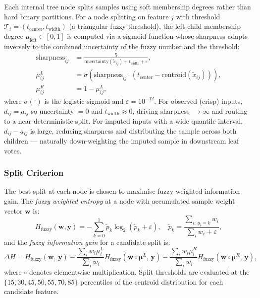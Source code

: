 \documentclass[a4paper,fleqn,longmktitle]{cas-sc}
\begin{document}
	Each internal tree node splits samples using soft membership
	degrees rather than hard binary partitions.
	For a node splitting on feature $j$ with threshold
	$\mathcal{T}_t = (t_{\text{center}}, t_{\text{width}})$
	(a triangular fuzzy threshold), the left-child membership
	degree $\mu_{\text{left}} \in [0, 1]$ is computed via a sigmoid
	function whose sharpness adapts inversely to the combined
	uncertainty of the fuzzy number and the threshold:
	\begin{align}
		\text{sharpness}_{ij} &=
		\frac{5}{\text{uncertainty}(\tilde{x}_{ij}) + t_{\text{width}} + \varepsilon},
		\label{eq:sharpness} \\[4pt]
		\mu^L_{ij} &=
		\sigma\!\left(
		\text{sharpness}_{ij} \cdot
		\left(t_{\text{center}} - \text{centroid}(\tilde{x}_{ij})\right)
		\right),
		\label{eq:mu_left} \\[4pt]
		\mu^R_{ij} &= 1 - \mu^L_{ij},
		\label{eq:mu_right}
	\end{align}
	where $\sigma(\cdot)$ is the logistic sigmoid and
	$\varepsilon = 10^{-12}$.
	For observed (crisp) inputs, $d_{ij} = a_{ij}$ so
	uncertainty $= 0$ and $t_{\text{width}} \approx 0$,
	driving sharpness $\to \infty$ and routing to a near-deterministic
	split.
	For imputed inputs with a wide quantile interval,
	$d_{ij} - a_{ij}$ is large, reducing sharpness and distributing
	the sample across both children — naturally down-weighting the
	imputed sample in downstream leaf votes.
	
	\subsubsection{Split Criterion}
	\label{sec:split_criterion}
	
	The best split at each node is chosen to maximise fuzzy
	weighted information gain.
	The \emph{fuzzy weighted entropy} at a node with accumulated
	sample weight vector $\mathbf{w}$ is:
	\begin{equation}
		H_{\text{fuzzy}}(\mathbf{w}, \mathbf{y}) =
		-\sum_{k=0}^{1}
		\tilde{p}_k \log_2(\tilde{p}_k + \varepsilon),
		\quad
		\tilde{p}_k = \frac{\sum_{i:\, y_i = k} w_i}{\sum_i w_i + \varepsilon},
		\label{eq:fuzzy_entropy}
	\end{equation}
	and the \emph{fuzzy information gain} for a candidate split is:
	\begin{equation}
		\Delta H =
		H_{\text{fuzzy}}(\mathbf{w},\, \mathbf{y})
		-
		\frac{\sum_i w_i \mu^L_i}{\sum_i w_i}
		H_{\text{fuzzy}}(\mathbf{w} \circ \boldsymbol{\mu}^L,\, \mathbf{y})
		-
		\frac{\sum_i w_i \mu^R_i}{\sum_i w_i}
		H_{\text{fuzzy}}(\mathbf{w} \circ \boldsymbol{\mu}^R,\, \mathbf{y}),
		\label{eq:fuzzy_ig}
	\end{equation}
	where $\circ$ denotes elementwise multiplication.
	Split thresholds are evaluated at the
	$\{15, 30, 45, 50, 55, 70, 85\}$ percentiles of the centroid
	distribution for each candidate feature.
	
\end{document}
